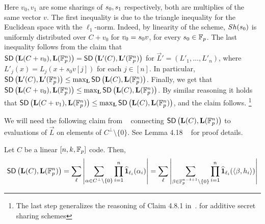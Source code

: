 Here $v_0,v_1$ are some sharings of $s_0,s_1$ respectively, both are multiplies of the same vector $v$. The first inequality is due to the triangle inequality for the Euclidean space with the $\ell_1$-norm. 
Indeed, by linearity of the scheme, $Sh(s_0)$ is uniformly distributed over $C+v_0$ for $v_0=s_0v$, for every $s_0\in \mathbb{F}_p$.
The last inequality  follows from the claim that $\mathsf{SD} \left({\mathbf{L}(C+v_0)},{\mathbf{L}(\mathbb{F}^n_p)} \right) = \mathsf{SD} \left({\mathbf{L}'(C)},{\mathbf{L}'(\mathbb{F}^n_p)} \right)$ for $\vec{L}'=(L'_1,\ldots,L'_n)$, where $L'_j(x)=L_j(x+s_0 v[j])$ for each $j\in [n]$.  In particular, $\mathsf{SD} \left({\mathbf{L}'(C)},{\mathbf{L}'(\mathbb{F}^n_p)} \right) \leq \max_{\mathbf{L}} \mathsf{SD} \left({\mathbf{L}(C)},{\mathbf{L}(\mathbb{F}^n_p)} \right)$. Finally, we get that $\mathsf{SD} \left({\mathbf{L}(C+v_0)},{\mathbf{L}(\mathbb{F}^n_p)} \right) \leq \max_{\mathbf{L}} \mathsf{SD} \left({\mathbf{L}(C)},{\mathbf{L}(\mathbb{F}^n_p)} \right)$.
By similar reasoning it holds that $\mathsf{SD} \left({\mathbf{L}(C+v_1)},{\mathbf{L}(\mathbb{F}^n_p)} \right) \leq \max_{\mathbf{L}} \mathsf{SD} \left({\mathbf{L}(C)},{\mathbf{L}(\mathbb{F}^n_p)} \right)$, and the claim follows.
\footnote{The last step generalizes the reasoning of Claim 4.8.1 in~\cite{EPRINT:BDIR19}. for additive secret sharing schemes}


We will need the following claim from ~\cite{EPRINT:BDIR19} connecting $\mathsf{SD} \left({\mathbf{L}(C)},{\mathbf{L}(\mathbb{F}^n_p)} \right)$ to evaluations of $\vec{L}$ on elements of $C^\bot \setminus\{0\}$. See Lemma 4.18 ~\cite{EPRINT:BDIR19} for proof details.

\begin{claim} \label{clm:dual}
Let $C$ be a linear $[n,k,\mathbb{F}_p]$ code. Then,
\begin{align}
\mathsf{SD} \left({\mathbf{L}(C)},{\mathbf{L}(\mathbb{F}^n_p)} \right)=\sum_{\mathbf{\ell}} \left|\sum_{\alpha\in C^{\bot}\setminus{\{0\}}}\prod^n_{i=1}\widehat{\mathbf{1}}_{\ell_i}(\alpha_i) \right|=\sum_{\mathbf{\ell}}\left|\sum_{\beta\in \mathbb{F}^{n-t+1}_p\setminus{\{0\}}}\prod^n_{i=1}\widehat{\mathbf{1}}_{\ell_i}(\langle\beta,h_i\rangle)\right| \nonumber
\end{align}
\end{claim}


